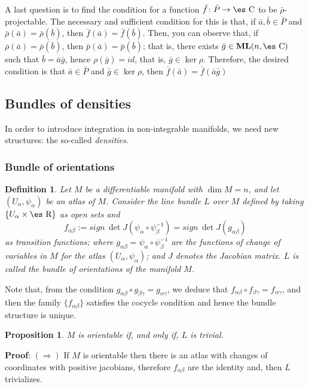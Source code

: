 \documentclass[12pt]{article}
\theoremstyle{plain}
\newtheorem{prop}{Proposition}
\newtheorem{definition}{Definition}
\def\ML{{\bf ML}(n,\Complex )}
\def\Real{\mbox{\es R}}
\def\Complex{\mbox{\es C}}
\begin{document}
A last question is to find the condition for a function $\bar f\colon
\bar P \to \Complex$
to be $\bar \rho$-projectable.
 The necessary and sufficient condition for this is that, if
 $\bar a,\bar b \in \bar P$ and
 $\bar \rho (\bar a) = \bar \rho (\bar b)$,
 then $\bar f(\bar a) = \bar f(\bar b)$.
Then, you can observe that, if $\bar \rho (\bar a) = \bar \rho (\bar
b)$,
then $\bar p (\bar a) = \bar p (\bar b)$; that is, there exists
$\bar g \in \ML$ such that $\bar b = \bar a \bar g$,
hence $\rho(\bar g) = id$, that is, $\bar g \in \ker \rho$.
Therefore, the desired condition is that $\bar a \in \bar P$ and
$\bar g \in \ker \rho$, then $\bar f(\bar a) = \bar f(\bar a \bar g)$



\subsection{Bundles of densities}


In order to introduce integration in non-integrable manifolds, we need
new
structures: the so-called {\it densities}.


\subsubsection{Bundle of orientations}


\begin{definition}
Let $M$ be a differentiable manifold with $\dim M = n$,
and let $(U_{\alpha},\psi_{\alpha})$ be an atlas of $M$.
Consider the line bundle $L$ over $M$ defined by taking
$\{ U_{\alpha} \times \Real \}$ as open sets and
$$
f_{\alpha \beta} :=
sign\, \det J(\psi_{\alpha} \circ \psi_{\beta}^{-1})=
sign\, \det J(g_{\alpha \beta})
$$
as transition functions; where $g_{\alpha \beta} = \psi_{\alpha} \circ
\psi_{\beta}^{-1}$
are the functions of change of variables in $M$ for the atlas
$(U_{\alpha},\psi_{\alpha})$; and $J$ denotes the Jacobian matrix.
$L$ is called the {\rm bundle of orientations} of the manifold $M$.
\label{fo}
\end {definition}

Note that, from the condition
$g_{\alpha \beta} \circ g_{\beta \gamma} = g_{\alpha \gamma}$,
we deduce that $f_{\alpha \beta} \circ f_{\beta \gamma} = f_{\alpha
\gamma}$,
and then the family $\{ f_{\alpha \beta} \}$ satisfies the cocycle
condition and hence
the bundle structure is unique.

\begin{prop}
$M$ is orientable if, and only if, $L$ is trivial.
\label{jusfo}
\end{prop}
{\bf Proof}: 
$(\Longrightarrow)$ \quad
If $M$ is orientable then there is an atlas with changes of coordinates
with positive jacobians,
therefore $f_{\alpha \beta}$ are the identity and, then $L$ trivializes.
\end{document}
